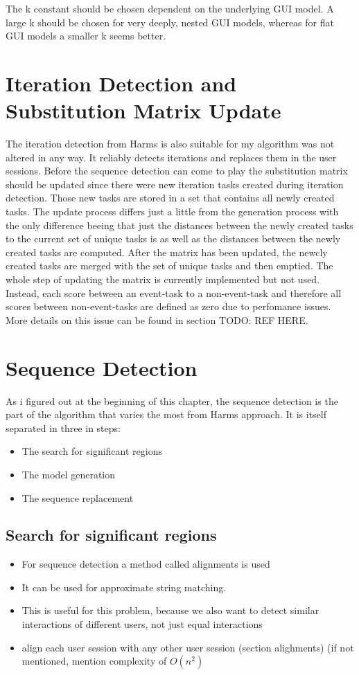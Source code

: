 The k constant should be chosen dependent on the underlying GUI model. A large k should be chosen for very deeply, nested GUI models, whereas for flat GUI models a smaller k seems better. 

\section{Iteration Detection and Substitution Matrix Update}
The iteration detection from Harms is also suitable for my algorithm was not altered in any way. It reliably detects iterations and replaces them in the user sessions.
Before the sequence detection can come to play the substitution matrix should be updated since there were new iteration tasks created during iteration detection. Those new tasks are stored in a set that contains all newly created tasks.
The update process differs just a little from the generation process with the only difference beeing that just the distances between the newly created tasks to the current set of unique tasks is as well as the distances between the newly created tasks are computed.
After the matrix has been updated, the newcly created tasks are merged with the set of unique tasks and then emptied.
The whole step of updating the matrix is currently implemented but not used. Instead, each score between an event-task to a non-event-task and therefore all scores between non-event-tasks are defined as zero due to perfomance issues.
More details on this issue can be found in section TODO: REF HERE.

\section{Sequence Detection}
As i figured out at the beginning of this chapter, the sequence detection is the part of the algorithm that varies the most from Harms approach.
It is itself separated in three in steps:
\begin{itemize}
	\item The search for significant regions
	\item The model generation
	\item The sequence replacement
\end{itemize}

\subsection{Search for significant regions}		
\begin{itemize}
	\item For sequence detection a method called alignments is used
	\item It can be used for approximate string matching. 
	\item This is useful for this problem, because we also want to detect similar interactions of different users, not just equal interactions
	\item align each user session with any other user session (section alighments)  (if not mentioned, mention complexity of $O(n^2)$
\end{itemize}

